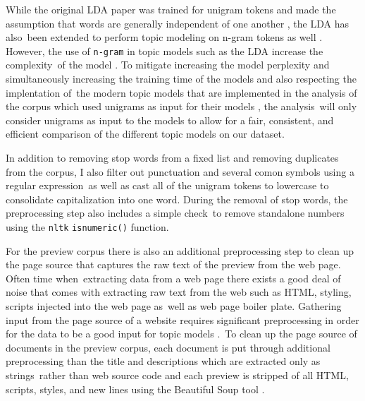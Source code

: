 \documentclass[letterpaper,12pt]{article}
\begin{document}
While the original LDA paper was trained for unigram tokens and made the assumption that words are generally independent of one another \cite{blei2003latent}, the LDA has also\
been extended to perform topic modeling on n-gram tokens as well \cite{wang2005note}. However, the use of \texttt{n-gram} in topic models such as the LDA increase the complexity\
of the model \cite{wang2007topical}. To mitigate increasing the model perplexity and simultaneously increasing the training time of the models and also respecting the implentation of\
the modern topic models that are implemented in the analysis of the corpus which used unigrams as input for their models \cite{moody2016mixing}\cite{dieng2019topic}, the analysis\
will only consider unigrams as input to the models to allow for a fair, consistent, and efficient comparison of the different topic models on our dataset.

In addition to removing stop words from a fixed list and removing duplicates from the corpus, I also filter out punctuation and several comon symbols using a regular expression\
as well as cast all of the unigram tokens to lowercase to consolidate capitalization into one word. During the removal of stop words, the preprocessing step also includes a simple check\
to remove standalone numbers using the \texttt{nltk} \cite{loper2002nltk} \texttt{isnumeric()} function.

For the preview corpus there is also an additional preprocessing step to clean up the page source that captures the raw text of the preview from the web page. Often time when\
extracting data from a web page there exists a good deal of noise that comes with extracting raw text from the web such as HTML, styling, scripts injected into the web page as\
well as web page boiler plate. Gathering input from the page source of a website requires significant preprocessing in order for the data to be a good input for topic models \cite{boyd2014care}.\
To clean up the page source of documents in the preview corpus, each document is put through additional preprocessing than the title and descriptions which are extracted only as strings\
rather than web source code and each preview is stripped of all HTML, scripts, styles, and new lines using the Beautiful Soup tool \cite{richardson2007beautiful}.
\end{document}
